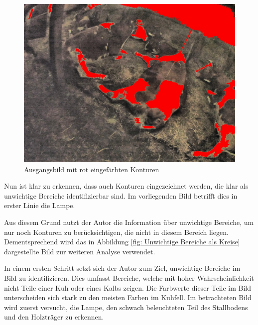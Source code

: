 \begin{figure}[H]
	\center
	\includegraphics[scale=0.43]{Grafiken/entwicklung/9thresholdedImage.jpg}
	\caption{Ausgangsbild mit rot eingefärbten Konturen} 
	\label{fig: Ausgangsbild mit rot eingefärbten Konturen} 
\end{figure}

Nun ist klar zu erkennen, dass auch Konturen eingezeichnet werden, die klar als unwichtige Bereiche identifizierbar sind. Im vorliegenden Bild betrifft dies in erster Linie die Lampe.

Aus diesem Grund nutzt der Autor die Information über unwichtige Bereiche, um nur noch Konturen zu berücksichtigen, die nicht in diesem Bereich liegen. Dementsprechend wird das in Abbildung \ref{fig: Unwichtige Bereiche als Kreise} dargestellte Bild zur weiteren Analyse verwendet. 

In einem ersten Schritt setzt sich der Autor zum Ziel, unwichtige Bereiche im Bild zu identifizieren. Dies umfasst Bereiche, welche mit hoher Wahrscheinlichkeit nicht Teile einer Kuh oder eines Kalbs zeigen. Die Farbwerte dieser Teile im Bild unterscheiden sich stark zu den meisten Farben im Kuhfell. Im betrachteten Bild wird zuerst versucht, die Lampe, den schwach beleuchteten Teil des Stallbodens und den Holzträger zu erkennen. 

